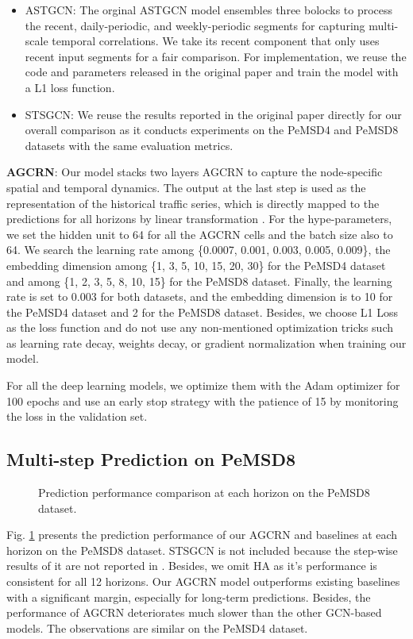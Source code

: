 \documentclass{article}
\begin{document}
\begin{itemize}
    \item ASTGCN: The orginal ASTGCN model ensembles three bolocks to process the recent, daily-periodic, and weekly-periodic segments for capturing multi-scale temporal correlations. We take its recent component that only uses recent input segments for a fair comparison. For implementation, we reuse the code and parameters released in the original paper and train the model with a L1 loss function. 
    \item STSGCN: We reuse the results reported in the original paper directly for our overall comparison as it conducts experiments on the PeMSD4 and PeMSD8 datasets with the same evaluation metrics.
\end{itemize}


\textbf{AGCRN}: Our model stacks two layers AGCRN to capture the node-specific spatial and temporal dynamics. The output at the last step is used as the representation of the historical traffic series, which is directly mapped to the predictions for all horizons by linear transformation . For the hype-parameters, we set the hidden unit to 64 for all the AGCRN cells and the batch size also to 64. We search the learning rate among \{0.0007, 0.001, 0.003, 0.005, 0.009\}, the embedding dimension among \{1, 3, 5, 10, 15, 20, 30\} for the PeMSD4 dataset and among \{1, 2, 3, 5, 8, 10, 15\} for the PeMSD8 dataset. Finally, the learning rate is set to 0.003 for both datasets, and the embedding dimension is to 10 for the PeMSD4 dataset and 2 for the PeMSD8 dataset. Besides, we choose L1 Loss as the loss function and do not use any non-mentioned optimization tricks such as learning rate decay, weights decay, or gradient normalization when training our model.

For all the deep learning models, we optimize them with the Adam optimizer for 100 epochs and use an early stop strategy with the patience of 15 by monitoring the loss in the validation set.



\subsection{Multi-step Prediction on PeMSD8}
\begin{figure}[h]
\centering
{}
\caption{Prediction performance comparison at each horizon on the PeMSD8 dataset.}
\label{pemsd8} 
\end{figure}
Fig. \ref{pemsd8} presents the prediction performance of our AGCRN and baselines at each horizon on the PeMSD8 dataset. STSGCN is not included because the step-wise results of it are not reported in \cite{stsgcn-aaai2020}. Besides, we omit HA as it's performance is consistent for all 12 horizons. Our AGCRN model outperforms existing baselines with a significant margin, especially for long-term predictions. Besides, the performance of AGCRN deteriorates much slower than the other GCN-based models. The observations are similar on the PeMSD4 dataset.
\end{document}
